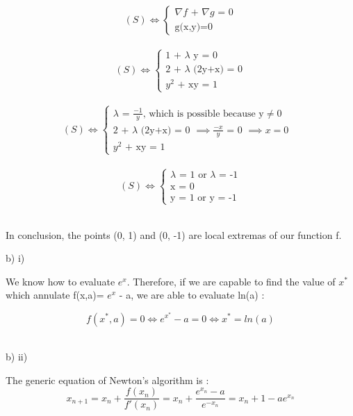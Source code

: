 \documentclass[12pt,a4paper]{report} %
\begin{document}
\[
(S) \Leftrightarrow \left\{
\begin{array}{l}
\text{$\nabla f$ + $\nabla g$ = 0} \\
\text{g(x,y)=0}
\end{array}
\right.
\] \\

\[
(S) \Leftrightarrow \left\{
\begin{array}{l}
\text{1 + $\lambda$ y = 0} \\
\text{2 + $\lambda$ (2y+x) = 0}\\
\text{$y^2$ + xy = 1}
\end{array}
\right.
\] \\

\[
(S) \Leftrightarrow \left\{
\begin{array}{l}
\text{$\lambda$ = $\frac{-1}{y}$, which is possible because y$\neq$0} \\
\text{2 + $\lambda$ (2y+x) = 0 $\implies \frac{-x}{y}$ = 0 $\implies x=0$ }\\
\text{$y^2$ + xy = 1}
\end{array}
\right.
\] \\

\[
(S) \Leftrightarrow \left\{
\begin{array}{l}
\text{$\lambda$ = 1 or $\lambda$ = -1} \\
\text{x = 0}\\
\text{y = 1 or y = -1}
\end{array}
\right.
\] \\
\vspace{0.5 cm}

In conclusion, the points (0, 1) and (0, -1) are local extremas of our function f. \\

\item b) i)

We know how to evaluate $e^x$. Therefore, if we are capable to find the value of $x^*$ which annulate f(x,a)= $e^x$  - a, we are able to evaluate ln(a) : 

\[
f(x^*,a) = 0 \Leftrightarrow e^{x^{*}} - a = 0 \Leftrightarrow x^*=ln(a)
\] \\

\item b) ii)

The generic equation of Newton's algorithm is :
\[
x_{n+1} = x_n + \frac{f(x_n)}{f'(x_{n})} = x_n + \frac{e^{x_n}-a}{e^{-x_n}} = x_n + 1 - ae^{x_n}
\] \\
\end{document}
